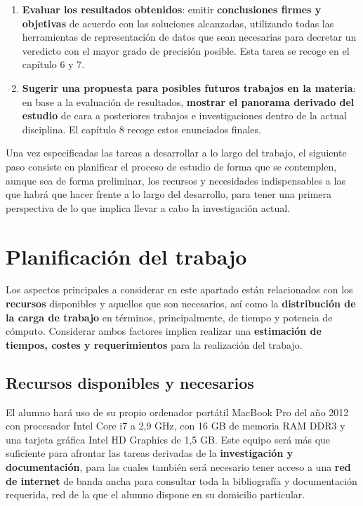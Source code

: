 \begin{enumerate}
	\item  \label{tarea6} \textbf{Evaluar los resultados obtenidos}: emitir \textbf{conclusiones firmes y objetivas} de acuerdo con las soluciones alcanzadas, utilizando todas las herramientas de representación de datos que sean necesarias para decretar un veredicto con el mayor grado de precisión posible. Esta tarea se recoge en el capítulo 6 y 7.
	
	\item  \label{tarea7} \textbf{Sugerir una propuesta para posibles futuros trabajos en la materia}: en base a la evaluación de resultados, \textbf{mostrar el panorama derivado del estudio} de cara a posteriores trabajos e investigaciones dentro de la actual disciplina. El capítulo 8 recoge estos enunciados finales.
\end{enumerate}

Una vez especificadas las tareas a desarrollar a lo largo del trabajo, el siguiente paso consiste en planificar el proceso de estudio de forma que se contemplen, aunque sea de forma preliminar, los recursos y necesidades indispensables a las que habrá que hacer frente a lo largo del desarrollo, para tener una primera perspectiva de lo que implica llevar a cabo la investigación actual.

\section{Planificación del trabajo} 

Los aspectos principales a considerar en este apartado están relacionados con los \textbf{recursos} disponibles y aquellos que son necesarios, así como la \textbf{distribución de la carga de trabajo} en términos, principalmente, de tiempo y potencia de cómputo. Considerar ambos factores implica realizar una \textbf{estimación de tiempos, costes y requerimientos} para la realización del trabajo.

\subsection{Recursos disponibles y necesarios}

El alumno hará uso de su propio ordenador portátil MacBook Pro del año 2012 con procesador Intel Core i7 a 2,9 GHz, con 16 GB de memoria RAM DDR3 y una tarjeta gráfica Intel HD Graphics de 1,5 GB. Este equipo será más que suficiente para afrontar las tareas derivadas de la \textbf{investigación y documentación}, para las cuales también será necesario tener acceso a una \textbf{red de internet} de banda ancha para consultar toda la bibliografía y documentación requerida, red de la que el alumno dispone en su domicilio particular.

